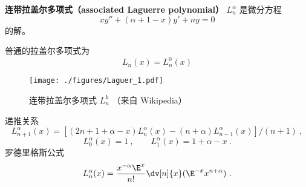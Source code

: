 
\begin{issues}
\issueDraft
\end{issues}

\textbf{连带拉盖尔多项式（associated Laguerre polynomial）} $L_{n}^\alpha$ 是微分方程
\begin{equation}
xy'' + (\alpha + 1 - x) y' + ny = 0
\end{equation}
的解。

普通的拉盖尔多项式为
\begin{equation}
L_n(x) = L_n^0(x)
\end{equation}

\begin{figure}[ht]
\centering
\texttt{[image: ./figures/Laguer\_1.pdf]}
\caption{连带拉盖尔多项式 $L_n^k$ （来自 Wikipedia）} \label{Laguer_fig1}
\end{figure}

递推关系
\begin{equation}
L_{n+1}^\alpha (x) = [(2n + 1 + \alpha  - x)L_n^\alpha (x) - (n + \alpha )L_{n - 1}^\alpha (x)]/(n + 1)~,
\end{equation}
\begin{equation}
L_0^\alpha (x) = 1~,
\qquad
L_1^\alpha (x) = 1 + \alpha  - x~.
\end{equation}  
罗德里格斯公式
\begin{equation}
L_n^\alpha (x) = \frac{x^{-\alpha} \E^x}{n!} \dv[n]{x} (\E^{-x} x^{n+\alpha})~.
\end{equation}
